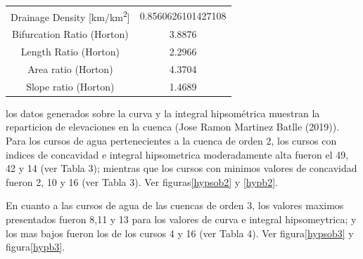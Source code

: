 \documentclass[11pt,]{article}
\begin{document}
\begin{longtable}[]{@{}cc@{}}
\begin{minipage}[t]{0.65\columnwidth}
Drainage Density {[}km/km\textsuperscript{2}{]}\strut
\end{minipage} & \begin{minipage}[t]{0.29\columnwidth}\centering\strut
0.8560626101427108\strut
\end{minipage}\tabularnewline
\begin{minipage}[t]{0.65\columnwidth}\centering\strut
Bifurcation Ratio (Horton)\strut
\end{minipage} & \begin{minipage}[t]{0.29\columnwidth}\centering\strut
3.8876\strut
\end{minipage}\tabularnewline
\begin{minipage}[t]{0.65\columnwidth}\centering\strut
Length Ratio (Horton)\strut
\end{minipage} & \begin{minipage}[t]{0.29\columnwidth}\centering\strut
2.2966\strut
\end{minipage}\tabularnewline
\begin{minipage}[t]{0.65\columnwidth}\centering\strut
Area ratio (Horton)\strut
\end{minipage} & \begin{minipage}[t]{0.29\columnwidth}\centering\strut
4.3704\strut
\end{minipage}\tabularnewline
\begin{minipage}[t]{0.65\columnwidth}\centering\strut
Slope ratio (Horton)\strut
\end{minipage} & \begin{minipage}[t]{0.29\columnwidth}\centering\strut
1.4689\strut
\end{minipage}\tabularnewline
\bottomrule
\end{longtable}

los datos generados sobre la curva y la integral hipsométrica muestran
la reparticion de elevaciones en la cuenca (Jose Ramon Martinez Batlle
(2019)). Para los cursos de agua pertenecientes a la cuenca de orden 2,
los cursos con indices de concavidad e integral hipsometrica
moderadamente alta fueron el 49, 42 y 14 (ver Tabla 3); mientras que los
cursos con minimos valores de concavidad fueron 2, 10 y 16 (ver Tabla
3). Ver figuras\ref{hypsob2} y \ref{hypb2}.

En cuanto a las cursos de agua de las cuencas de orden 3, los valores
maximos presentados fueron 8,11 y 13 para los valores de curva e
integral hipsomeytrica; y los mas bajos fueron los de los cursos 4 y 16
(ver Tabla 4). Ver figura\ref{hypsob3} y figura\ref{hypb3}.
\end{document}
